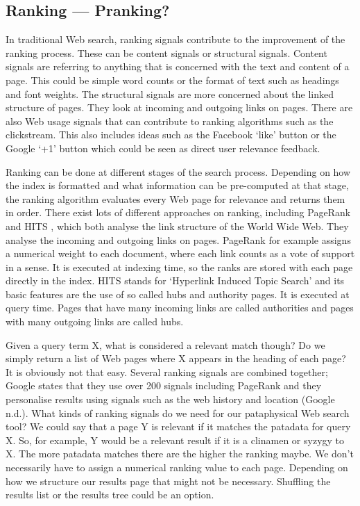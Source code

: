 \subsection{Ranking --- Pranking?}

In traditional Web search, ranking signals contribute to the improvement of the ranking process. These can be content signals or structural signals. Content signals are referring to anything that is concerned with the text and content of a page. This could be simple word counts or the format of text such as headings and font weights. The structural signals are more concerned about the linked structure of pages. They look at incoming and outgoing links on pages. There are also Web usage signals that can contribute to ranking algorithms such as the clickstream. This also includes ideas such as the Facebook `like' button or the Google `+1' button which could be seen as direct user relevance feedback.

Ranking can be done at different stages of the search process. Depending on how the index is formatted and what information can be pre-computed at that stage, the ranking algorithm evaluates every Web page for relevance and returns them in order. There exist lots of different approaches on ranking, including PageRank \autocite{Brin1998} and HITS \autocite{Kleinberg1999}, which both analyse the link structure of the World Wide Web. They analyse the incoming and outgoing links on pages. PageRank for example assigns a numerical weight to each document, where each link counts as a vote of support in a sense. It is executed at indexing time, so the ranks are stored with each page directly in the index. HITS stands for `Hyperlink Induced Topic Search' and its basic features are the use of so called hubs and authority pages. It is executed at query time. Pages that have many incoming links are called authorities and pages with many outgoing links are called hubs.

Given a query term X, what is considered a relevant match though? Do we simply return a list of Web pages where X appears in the heading of each page? It is obviously not that easy. Several ranking signals are combined together; Google states that they use over 200 signals including PageRank and they personalise results using signals such as the web history and location (Google n.d.).
What kinds of ranking signals do we need for our pataphysical Web search tool? We could say that a page Y is relevant if it matches the patadata for query X. So, for example, Y would be a relevant result if it is a clinamen or syzygy to X. The more patadata matches there are the higher the ranking maybe. We don't necessarily have to assign a numerical ranking value to each page. Depending on how we structure our results page that might not be necessary. Shuffling the results list or the results tree could be an option.

